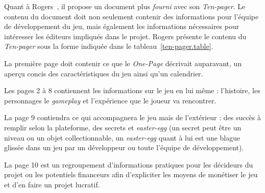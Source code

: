 Quant \`a Rogers~\cite{LevelUpRogers2014}, il  propose un document plus \emph{fourni} avec son \emph{Ten-pager}.
Le contenu du document doit non seulement contenir des informations pour l'équipe de développement du jeu, mais également les informations nécessaires pour int\'eresser les éditeurs impliqués dans le projet.
Rogers présente le contenu du \emph{Ten-pager} sous la forme indiqu\'ee dans le tableau~\ref{ten-pager.table}.

La première page doit contenir ce que le \emph{One-Page} décrivait auparavant, un aperçu concis des caractéristiques du jeu ainsi qu'un calendrier.

Les pages 2 à 8 contiennent les informations sur le jeu en lui même : l'histoire, les personnages le \emph{gameplay} et l'expérience que le joueur va rencontrer.

La page 9 contiendra ce qui accompagnera le jeu mais de l'extérieur : des succès à remplir selon la plateforme, des secrets et \emph{easter-egg} (un secret peut être un niveau ou un objet collectionnable, un \emph{easter-egg} quant à lui est une blague glissée dans un jeu par un développeur ou toute l'équipe de développement).

La page 10 est un regroupement d'informations pratiques pour les décideurs du projet ou les potentiels financeurs afin d'expliciter les moyens de monétiser le jeu et d'en faire un projet lucratif.
    


